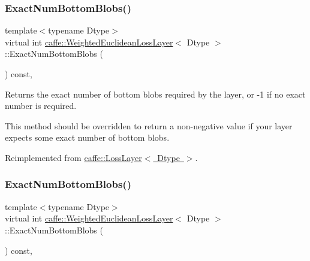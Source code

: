 \subsubsection{\texorpdfstring{Exact\+Num\+Bottom\+Blobs()}{ExactNumBottomBlobs()}\hspace{0.1cm}{\footnotesize\ttfamily [1/2]}}
{\footnotesize\ttfamily template$<$typename Dtype$>$ \\
virtual int \mbox{\hyperlink{classcaffe_1_1_weighted_euclidean_loss_layer}{caffe\+::\+Weighted\+Euclidean\+Loss\+Layer}}$<$ Dtype $>$\+::Exact\+Num\+Bottom\+Blobs (\begin{DoxyParamCaption}{ }\end{DoxyParamCaption}) const\hspace{0.3cm}{\ttfamily [inline]}, {\ttfamily [virtual]}}



Returns the exact number of bottom blobs required by the layer, or -\/1 if no exact number is required. 

This method should be overridden to return a non-\/negative value if your layer expects some exact number of bottom blobs. 

Reimplemented from \mbox{\hyperlink{classcaffe_1_1_loss_layer_af1620064baefb711e2c767bdc92b6fb1}{caffe\+::\+Loss\+Layer$<$ Dtype $>$}}.

\mbox{\label{classcaffe_1_1_weighted_euclidean_loss_layer_a2ac1ab6f657c6531dee37f80a971bbd9}} 
\subsubsection{\texorpdfstring{Exact\+Num\+Bottom\+Blobs()}{ExactNumBottomBlobs()}\hspace{0.1cm}{\footnotesize\ttfamily [2/2]}}
{\footnotesize\ttfamily template$<$typename Dtype$>$ \\
virtual int \mbox{\hyperlink{classcaffe_1_1_weighted_euclidean_loss_layer}{caffe\+::\+Weighted\+Euclidean\+Loss\+Layer}}$<$ Dtype $>$\+::Exact\+Num\+Bottom\+Blobs (\begin{DoxyParamCaption}{ }\end{DoxyParamCaption}) const\hspace{0.3cm}{\ttfamily [inline]}, {\ttfamily [virtual]}}



